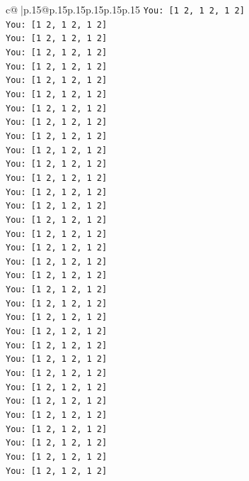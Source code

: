\documentclass{article}
\begin{document}
{\begin{supertabular}{c@{$\;$}|p{.15\linewidth}@{}p{.15\linewidth}p{.15\linewidth}p{.15\linewidth}p{.15\linewidth}p{.15\linewidth}}
{{{\texttt{You: {[}1 2, 1 2, 1 2{]}} \\
\texttt{You: {[}1 2, 1 2, 1 2{]}} \\
\texttt{You: {[}1 2, 1 2, 1 2{]}} \\
\texttt{You: {[}1 2, 1 2, 1 2{]}} \\
\texttt{You: {[}1 2, 1 2, 1 2{]}} \\
\texttt{You: {[}1 2, 1 2, 1 2{]}} \\
\texttt{You: {[}1 2, 1 2, 1 2{]}} \\
\texttt{You: {[}1 2, 1 2, 1 2{]}} \\
\texttt{You: {[}1 2, 1 2, 1 2{]}} \\
\texttt{You: {[}1 2, 1 2, 1 2{]}} \\
\texttt{You: {[}1 2, 1 2, 1 2{]}} \\
\texttt{You: {[}1 2, 1 2, 1 2{]}} \\
\texttt{You: {[}1 2, 1 2, 1 2{]}} \\
\texttt{You: {[}1 2, 1 2, 1 2{]}} \\
\texttt{You: {[}1 2, 1 2, 1 2{]}} \\
\texttt{You: {[}1 2, 1 2, 1 2{]}} \\
\texttt{You: {[}1 2, 1 2, 1 2{]}} \\
\texttt{You: {[}1 2, 1 2, 1 2{]}} \\
\texttt{You: {[}1 2, 1 2, 1 2{]}} \\
\texttt{You: {[}1 2, 1 2, 1 2{]}} \\
\texttt{You: {[}1 2, 1 2, 1 2{]}} \\
\texttt{You: {[}1 2, 1 2, 1 2{]}} \\
\texttt{You: {[}1 2, 1 2, 1 2{]}} \\
\texttt{You: {[}1 2, 1 2, 1 2{]}} \\
\texttt{You: {[}1 2, 1 2, 1 2{]}} \\
\texttt{You: {[}1 2, 1 2, 1 2{]}} \\
\texttt{You: {[}1 2, 1 2, 1 2{]}} \\
\texttt{You: {[}1 2, 1 2, 1 2{]}} \\
\texttt{You: {[}1 2, 1 2, 1 2{]}} \\
\texttt{You: {[}1 2, 1 2, 1 2{]}} \\
\texttt{You: {[}1 2, 1 2, 1 2{]}} \\
\texttt{You: {[}1 2, 1 2, 1 2{]}} \\
\texttt{You: {[}1 2, 1 2, 1 2{]}} \\
\texttt{You: {[}1 2, 1 2, 1 2{]}} \\
}}}
\end{supertabular}}
\end{document}
